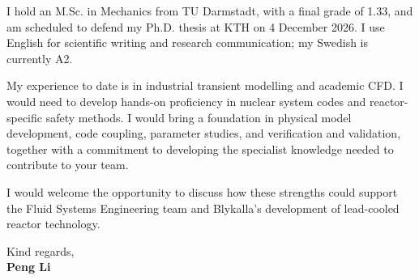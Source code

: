 \documentclass[a4paper,11pt]{article}
\begin{document}
I hold an M.Sc. in Mechanics from TU Darmstadt, with a final grade of 1.33, and am
scheduled to defend my Ph.D. thesis at KTH on 4 December 2026. I use English for
scientific writing and research communication; my Swedish is currently A2.

My experience to date is in industrial transient modelling and academic CFD. I would need
to develop hands-on proficiency in nuclear system codes and reactor-specific safety methods.
I would bring a foundation in physical model development, code coupling, parameter studies,
and verification and validation, together with a commitment to developing the specialist
knowledge needed to contribute to your team.

I would welcome the opportunity to discuss how these strengths could support the Fluid
Systems Engineering team and Blykalla's development of lead-cooled reactor technology.

Kind regards,\\[3pt]
\textbf{Peng Li}
\end{document}
